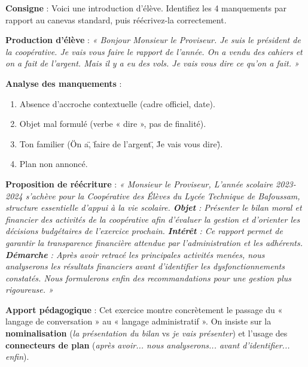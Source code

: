 \documentclass[11pt]{article}
\begin{document}
\begin{exoresolu}
\textbf{Consigne} : Voici une introduction d'élève. Identifiez les 4 manquements par rapport au canevas standard, puis réécrivez-la correctement.

\textbf{Production d'élève} :
\emph{« Bonjour Monsieur le Proviseur. Je suis le président de la coopérative. Je vais vous faire le rapport de l'année. On a vendu des cahiers et on a fait de l'argent. Mais il y a eu des vols. Je vais vous dire ce qu'on a fait. »}

\textbf{Analyse des manquements} :
\begin{enumerate}
    \item Absence d'accroche contextuelle (cadre officiel, date).
    \item Objet mal formulé (verbe « dire », pas de finalité).
    \item Ton familier (\"On a\", \"faire de l'argent\", \"Je vais vous dire\").
    \item Plan non annoncé.
\end{enumerate}

\textbf{Proposition de réécriture} :
\emph{« Monsieur le Proviseur, L'année scolaire 2023-2024 s'achève pour la Coopérative des Élèves du Lycée Technique de Bafoussam, structure essentielle d'appui à la vie scolaire. \textbf{Objet} : Présenter le bilan moral et financier des activités de la coopérative afin d'évaluer la gestion et d'orienter les décisions budgétaires de l'exercice prochain. \textbf{Intérêt} : Ce rapport permet de garantir la transparence financière attendue par l'administration et les adhérents. \textbf{Démarche} : Après avoir retracé les principales activités menées, nous analyserons les résultats financiers avant d'identifier les dysfonctionnements constatés. Nous formulerons enfin des recommandations pour une gestion plus rigoureuse. »}

\tcblower
\textbf{Apport pédagogique} : Cet exercice montre concrètement le passage du « langage de conversation » au « langage administratif ». On insiste sur la \textbf{nominalisation} (\emph{la présentation du bilan} vs \emph{je vais présenter}) et l'usage des \textbf{connecteurs de plan} (\emph{après avoir... nous analyserons... avant d'identifier... enfin}).
\end{exoresolu}
\end{document}
